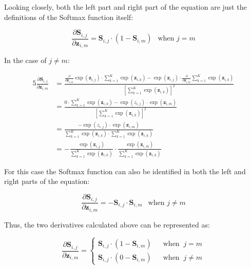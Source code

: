 \documentclass[a4paper]{article}
\newcommand{\matr}[1]{\mathbf{#1}}
\newcommand{\vect}[1]{\bm{#1}}
\begin{document}
Looking closely, both the left part and right part of the equation are just the definitions of the Softmax function itself:

\begin{equation*}
    \frac{\partial \matr{S}_{i,j}}{\partial \vect{z}_{i,m}} = \matr{S}_{i,j} \cdot (1 - \matr{S}_{i,m}) ~~ \text{ when } j=m
\end{equation*}

\pagebreak
In the case of $j\not=m$:

\begin{alignat*}{5}
    \frac{\partial \matr{S}_{i,j}}{\partial \vect{z}_{i,m}} &= \frac{\frac{\partial}{\partial \vect{z}_{i,m}} \exp(\vect{z}_{i,j}) \cdot \sum_{k=1}^{K} \exp(\vect{z}_{i,k}) - \exp(\vect{z}_{i,j}) \cdot \frac{\partial}{\partial \vect{z}_{i,m}} \sum_{k=1}^{K} \exp(\vect{z}_{i,k})}{[\sum_{k=1}^{K} \exp(\vect{z}_{i,k})]^2} \\
    &= \frac{0 \cdot \sum_{k=1}^{K}\exp(\vect{z}_{i,k}) - \exp({z}_{i,j}) \cdot \exp(\vect{z}_{i,m})}{[\sum_{k=1}^{K} \exp(\vect{z}_{i,k})]^2} \\
    &= \frac{- \exp({z}_{i,j}) \cdot \exp(\vect{z}_{i,m})}{\sum_{k=1}^{K} \exp(\vect{z}_{i,k}) \cdot \sum_{k=1}^{K} \exp(\vect{z}_{i,k})} \\
    &= -\frac{\exp(\vect{z}_{i,j})}{\sum_{k=1}^{K} \exp(\vect{z}_{i,k})} \cdot \frac{\exp(\vect{z}_{i,m})}{\sum_{k=1}^{K} \exp(\vect{z}_{i,k})}
\end{alignat*}

For this case the Softmax function can also be identified in both the left and right parts of the equation:

\begin{equation*}
    \frac{\partial \matr{S}_{i,j}}{\partial \vect{z}_{i,m}} = -\matr{S}_{i,j} \cdot \matr{S}_{i,m} ~~ \text{ when } j\not=m
\end{equation*}

Thus, the two derivatives calculated above can be represented as:

\begin{equation*}
    \frac{\partial\matr{S}_{i,j}}{\partial\vect{z}_{i,m}} = 
    \begin{cases}
        \matr{S}_{i,j} \cdot (1 - \matr{S}_{i,m}) & ~~ \text{ when } ~ j = m \\
        \matr{S}_{i,j} \cdot (0 - \matr{S}_{i,m}) & ~~ \text{ when } ~ j \not= m
      \end{cases}       
\end{equation*}
\end{document}
